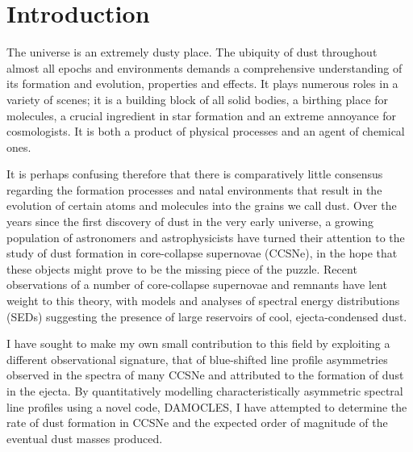 \chapter{Introduction}\label{chp:chp1}

%
%



The universe is an extremely dusty place.  The ubiquity of dust throughout almost all epochs and environments demands a comprehensive understanding of its formation and evolution, properties and effects.  It plays numerous roles in a variety of scenes; it is a building block of  all solid bodies, a birthing place for molecules, a crucial ingredient in star formation and an extreme annoyance for cosmologists.  It is both a product of physical processes and an agent of chemical ones.

It is perhaps confusing therefore that there is comparatively little consensus regarding the formation processes and natal environments that result in the evolution of certain atoms and molecules into the grains we call dust.  Over the years since the first discovery  of dust in the very early universe, a growing population of astronomers and astrophysicists have turned their attention to the study of dust formation in core-collapse supernovae (CCSNe), in the hope that these objects might prove to be the missing piece of the puzzle.  Recent observations of a number of core-collapse supernovae  and remnants have lent weight to this theory, with models and analyses of spectral energy distributions (SEDs)  suggesting the presence of large reservoirs of cool, ejecta-condensed dust. 

I have sought to make my own small contribution to this field by exploiting a different observational signature, that of  blue-shifted line profile asymmetries observed in the spectra of many CCSNe and attributed to the formation of dust in the ejecta.  By quantitatively modelling characteristically asymmetric spectral line profiles using a novel code, DAMOCLES, I have attempted to determine the rate of dust formation in CCSNe and the expected order of magnitude of the eventual dust masses produced.

